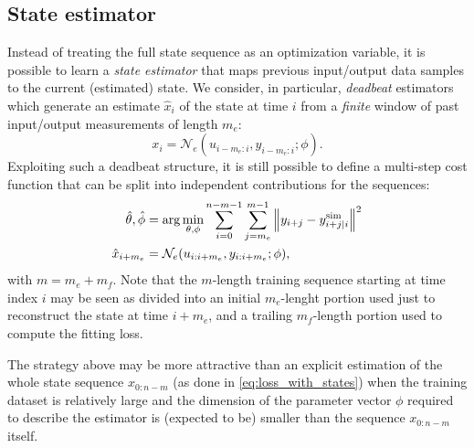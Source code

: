 \documentclass{article}
\newcommand{\NN}{\mathcal{N}} %
\newcommand{\nsamp}{n}
\newcommand{\seqlen}{m}
\newcommand{\norm}[1]{\left\lVert#1\right\rVert}
\newcommand{\simul}[1]{{#1}^{\rm sim}}
\begin{document}
\subsection{State estimator}
Instead of treating the full state sequence as an optimization variable, it is possible to learn a \emph{state estimator} that maps previous
input/output data samples to the current (estimated) state. We consider, in particular,  \emph{deadbeat} estimators which generate an estimate $\hat x_i$ of the state
at time $i$ from a \emph{finite} window of past input/output measurements of length $m_e$:
\begin{equation}\label{eqn:estimator}
 x_{i} = \NN_e(u_{i-\seqlen_e:i}, y_{i-\seqlen_e:i}; \phi).
\end{equation}
Exploiting such a deadbeat structure, it is still possible to define a multi-step cost function that can be split into independent contributions for the sequences:
\begin{subequations}
\label{eq:loss_with_estimator}
\begin{align}
 \hat \theta, \hat \phi &= \arg \min_{\theta, \phi} 
 \sum_{i=0}^{\nsamp - \seqlen - 1} \sum_{j=\seqlen_e}^{\seqlen -1} \norm{y_{i+j} - \simul{y}_{i+j|i}}^2\\
  \hat x_{i+\seqlen_e} &= \NN_e(u_{i:i+\seqlen_e}, y_{i:i+\seqlen_e}; \phi),
 \end{align}
\end{subequations}
with $\seqlen = \seqlen_e + \seqlen_f$. 
Note that the $m$-length training sequence starting at time index $i$ may be seen as divided into an initial $\seqlen_e$-lenght portion used just to reconstruct the state at time $i+\seqlen_e$, and a trailing $m_f$-length portion used to compute the fitting loss.%

The strategy above may be more attractive than an explicit estimation of the whole state sequence $x_{0:\nsamp-\seqlen}$ (as done in \eqref{eq:loss_with_states}) when the training dataset is relatively large and the dimension of the parameter vector $\phi$ required to describe the estimator is (expected to be) smaller than the sequence $x_{0:\nsamp-\seqlen}$ itself.
\end{document}
